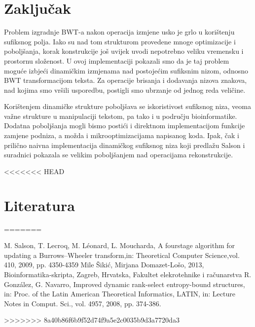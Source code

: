 \documentclass{ferseminar}
\begin{document}
\section{Zaključak}
Problem izgradnje BWT-a nakon operacija izmjene usko je grlo u korištenju sufiksnog polja. Iako su nad tom strukturom provedene mnoge optimizacije i poboljšanja, korak konstrukcije još uvijek uvodi nepotrebno veliku vremensku i prostornu složenost. U ovoj implementaciji pokazali smo da je taj problem moguće izbjeći dinamičkim izmjenama nad postojećim sufiksnim nizom, odnosno BWT transformacijom teksta. Za operacije brisanja i dodavanja nizova znakova, nad kojima smo vršili usporedbu, postigli smo ubrzanje od jednog reda veličine.

Korištenjem dinamičke strukture poboljšava se iskoristivost sufiksnog niza, veoma važne strukture u manipulaciji tekstom, pa tako i u području bioinformatike. Dodatna poboljšanja mogli bismo postići i direktnom implementacijom funkcije zamjene podniza, a možda i mikrooptimizacijama napisanog koda. Ipak, čak i prilično naivna implementacija dinamičkog sufiksnog niza koji predlažu Salson i suradnici pokazala se velikim poboljšanjem nad operacijama rekonstrukcije.

<<<<<<< HEAD
\section{Literatura}


=======
\begin{thebibliography}{1}

  	 M. Salson, T. Lecroq, M. Léonard, L. Moucharda,  A fourstage algorithm for updating a Burrows–Wheeler transform,in: Theoretical Computer Science,vol. 410, 2009, pp. 4350-4359 
	 Mile Šikić, Mirjana Domazet-Lošo, 2013, Bioinformatika-skripta, Zagreb, Hrvatska,  Fakultet elekrotehnike i računarstva
	 R. González, G. Navarro, Improved dynamic rank-select entropy-bound structures, in: Proc. of the Latin American Theoretical Informatics, LATIN, in: Lecture Notes in Comput. Sci., vol. 4957, 2008, pp. 374-386.
\end{thebibliography}
>>>>>>> 8a40b86f6b9f52d74f9a5e2c0035b9d3a7720da3
\end{document}
